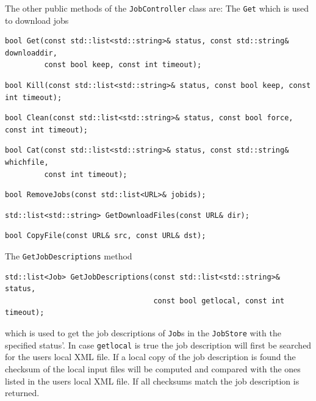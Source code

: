 \documentclass{book}
\newcommand{\Job}{\texttt{Job}}
\newcommand{\JobController}{\texttt{JobController}}
\begin{document}
The other public methods of the {\JobController} class are:
The \texttt{Get} which is used to download jobs
\begin{shaded}
\begin{verbatim}
bool Get(const std::list<std::string>& status, const std::string& downloaddir,
         const bool keep, const int timeout);
\end{verbatim}
\end{shaded}
\begin{shaded}
\begin{verbatim}
bool Kill(const std::list<std::string>& status, const bool keep, const int timeout);
\end{verbatim}
\end{shaded}
\begin{shaded}
\begin{verbatim}
bool Clean(const std::list<std::string>& status, const bool force, const int timeout);
\end{verbatim}
\end{shaded}
\begin{shaded}
\begin{verbatim}
bool Cat(const std::list<std::string>& status, const std::string& whichfile, 
         const int timeout);
\end{verbatim}
\end{shaded}
\begin{shaded}
\begin{verbatim}
bool RemoveJobs(const std::list<URL>& jobids);
\end{verbatim}
\end{shaded}
\begin{shaded}
\begin{verbatim}
std::list<std::string> GetDownloadFiles(const URL& dir);
\end{verbatim}
\end{shaded}
\begin{shaded}
\begin{verbatim}
bool CopyFile(const URL& src, const URL& dst);
\end{verbatim}
\end{shaded}
The \texttt{GetJobDescriptions} method 
\begin{shaded}
\begin{verbatim}
std::list<Job> GetJobDescriptions(const std::list<std::string>& status, 
                                  const bool getlocal, const int timeout);
\end{verbatim}
\end{shaded}
which is used to get the job descriptions of {\Job}s in the \texttt{JobStore} 
with the specified status'. In case \texttt{getlocal} is true the job description 
will first be searched for the users local XML file. If a local copy of 
the job description is found the checksum of the local input files will be 
computed and compared with the ones listed in the users local XML file. If 
all checksums match the job description is returned.
\end{document}
